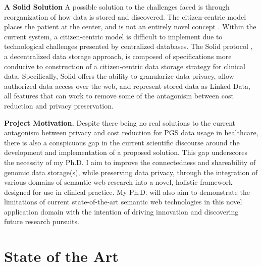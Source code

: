 \documentclass[runningheads]{llncs}
\begin{document}
\textbf{A Solid Solution} 
A possible solution to the challenges faced is through reorganization of how data is stored and discovered. 
The citizen-centric model places the patient at the center, and is not an entirely novel concept \cite{brands_patient-centered_2022}.
Within the current system, a citizen-centric model is difficult to implement due to technological challenges presented by centralized databases.
The Solid protocol \cite{capadisli_solid_nodate}, a decentralized data storage approach, is composed of specifications more conducive to construction of a citizen-centric data storage strategy for clinical data.
Specifically, Solid offers the ability to granularize data privacy, allow authorized data access over the web, and represent stored data as Linked Data, all features that can work to remove some of the antagonism between cost reduction and privacy preservation.


\textbf{Project Motivation.}
Despite there being no real solutions to the current antagonism between privacy and cost reduction for PGS data usage in healthcare, there is also a conspicuous gap in the current scientific discourse around the development and implementation of a proposed solution. 
This gap underscores the necessity of my Ph.D.
I aim to improve the connectedness and shareability of genomic data storage(s), while preserving data privacy, through the integration of various domains of semantic web research into a novel, holistic framework designed for use in clinical practice. 
My Ph.D. will also aim to demonstrate the limitations of current state-of-the-art semantic web technologies in this novel application domain with the intention of driving innovation and discovering future research pursuits.


\section{State of the Art}

\end{document}

